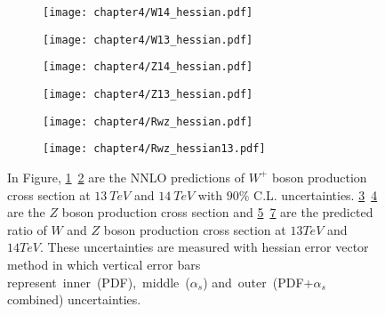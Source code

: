 \documentclass[a4paper,12pt]{report}
\numberwithin{equation}{section}
\begin{document}
\begin{figure}[H]
\centering
\begin{subfigure}{0.49\textwidth}
\texttt{[image: chapter4/W14\_hessian.pdf]}
\vspace*{-8mm}
\caption{}
\label{w14_he}
\end{subfigure}
\begin{subfigure}{0.49\textwidth}
\texttt{[image: chapter4/W13\_hessian.pdf]}
\vspace*{-8mm}
\caption{}
\label{w13_he}
\end{subfigure}
\begin{subfigure}{0.49\textwidth}
\texttt{[image: chapter4/Z14\_hessian.pdf]}
\vspace*{-8mm}
\caption{}
\label{z14_he}
\end{subfigure}
\begin{subfigure}{0.49\textwidth}
\texttt{[image: chapter4/Z13\_hessian.pdf]}
\vspace*{-8mm}
\caption{}
\label{z13_he}
\end{subfigure}
\begin{subfigure}{0.49\textwidth}
\texttt{[image: chapter4/Rwz\_hessian.pdf]}
\vspace*{-8mm}
\caption{}
\label{rwz14_he}
\end{subfigure}
\begin{subfigure}{0.49\textwidth}
\texttt{[image: chapter4/Rwz\_hessian13.pdf]}
\vspace*{-8mm}
\caption{}
\label{rwz13_he}
\end{subfigure}
\caption{In Figure, \ref{w14_he}~\ref{w13_he} are the NNLO predictions of $W^{+}$ boson production cross section at $13~TeV$ and $14~TeV$ with $90\%$ C.L. uncertainties. \ref{z14_he}~\ref{z13_he} are the $Z$ boson production cross section and \ref{rwz14_he}~\ref{rwz13_he} are the predicted ratio of $W$ and $Z$ boson production cross section at $13TeV$ and $14TeV$. These uncertainties are measured with hessian error vector method in which vertical error bars represent~inner~(PDF),~middle~($\alpha_{s}$) and~outer~(PDF+$\alpha_{s}$ combined) uncertainties.} 
\end{figure}
\end{document}

